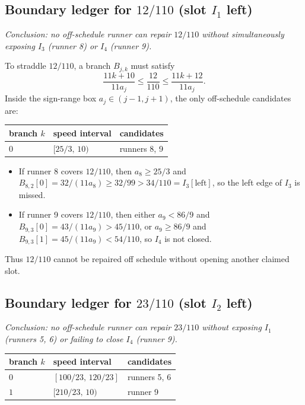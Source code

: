 \documentclass[12pt]{article}
\begin{document}
\subsection{Boundary ledger for $12/110$ (slot $I_1$ left)}

\emph{Conclusion: no off-schedule runner can repair $12/110$ without simultaneously exposing
$I_3$ (runner 8) or $I_4$ (runner 9).}

To straddle $12/110$, a branch $B_{j,k}$ must satisfy
\[
\frac{11k+10}{11a_j} \le \frac{12}{110} \le \frac{11k+12}{11a_j}.
\]
Inside the sign-range box $a_j\in(j-1,j+1)$, the only off-schedule candidates are:

\begin{center}
\begin{tabular}{@{}lll@{}}
\toprule
branch $k$ & speed interval & candidates \\
\midrule
$0$ & $[25/3,\,10)$ & runners 8, 9 \\
\bottomrule
\end{tabular}
\end{center}

\begin{itemize}
\item If runner 8 covers $12/110$, then $a_8\ge 25/3$ and
  $B_{8,2}[0]=32/(11a_8)\ge 32/99>34/110=I_3[\mathrm{left}]$,
  so the left edge of $I_3$ is missed.
\item If runner 9 covers $12/110$, then either $a_9<86/9$ and
  $B_{9,3}[0]=43/(11a_9)>45/110$, or $a_9\ge 86/9$ and
  $B_{9,3}[1]=45/(11a_9)<54/110$, so $I_4$ is not closed.
\end{itemize}

Thus $12/110$ cannot be repaired off schedule without opening another claimed slot.

\subsection{Boundary ledger for $23/110$ (slot $I_2$ left)}

\emph{Conclusion: no off-schedule runner can repair $23/110$ without exposing $I_1$ (runners
5, 6) or failing to close $I_4$ (runner 9).}

\begin{center}
\begin{tabular}{@{}lll@{}}
\toprule
branch $k$ & speed interval & candidates \\
\midrule
$0$ & $[100/23,\,120/23]$ & runners 5, 6 \\
$1$ & $[210/23,\,10)$ & runner 9 \\
\bottomrule
\end{tabular}
\end{center}
\end{document}
